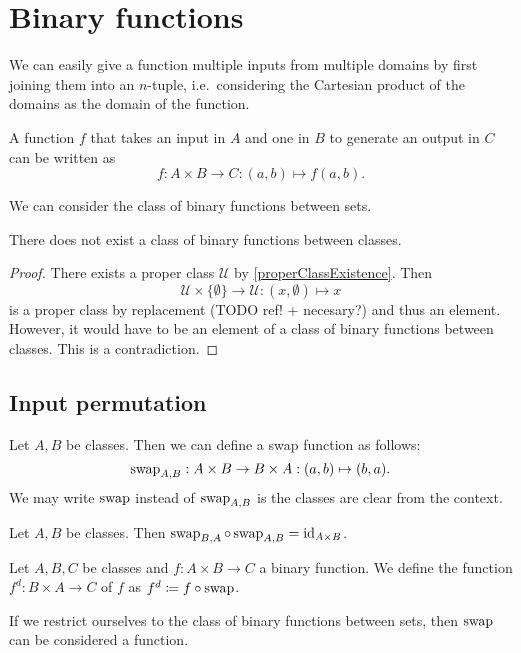 \section{Binary functions}
We can easily give a function multiple inputs from multiple domains by first joining them into an $n$-tuple, i.e.\ considering the Cartesian product of the domains as the domain of the function.

\begin{example}
A function $f$ that takes an input in $A$ and one in $B$ to generate an output in $C$ can be written as
\[ f: A\times B \to C: (a,b)\mapsto f(a,b). \]
\end{example}

We can consider the class of binary functions between sets.
\begin{lemma}
There does not exist a class of binary functions between classes.
\end{lemma}
\begin{proof}
There exists a proper class $\mathcal{U}$ by \ref{properClassExistence}. Then
\[ \mathcal{U}\times \{\emptyset\}\to \mathcal{U}: (x,\emptyset) \mapsto x \]
is a proper class by replacement (TODO ref! + necesary?) and thus an element. However, it would have to be an element of a class of binary functions between classes. This is a contradiction.
\end{proof}

\subsection{Input permutation}

Let $A,B$ be classes. Then we can define a swap function as follows:
\[ \operatorname{swap}_{A,B}: A\times B \to B\times A: (a,b) \mapsto (b,a). \]
We may write $\operatorname{swap}$ instead of $\operatorname{swap}_{A,B}$ is the classes are clear from the context.

\begin{lemma}
Let $A, B$ be classes. Then $\operatorname{swap}_{B,A}\circ \operatorname{swap}_{A,B} = \operatorname{id}_{A\times B}$.
\end{lemma}

\begin{definition}
Let $A, B, C$ be classes and $f: A\times B \to C$ a binary function. We define the  function $f^d: B\times A \to C$ of $f$ as $f^d \coloneqq f\circ \operatorname{swap}$. 
\end{definition}

If we restrict ourselves to the class of binary functions between sets, then $\operatorname{swap}$ can be considered a function.

